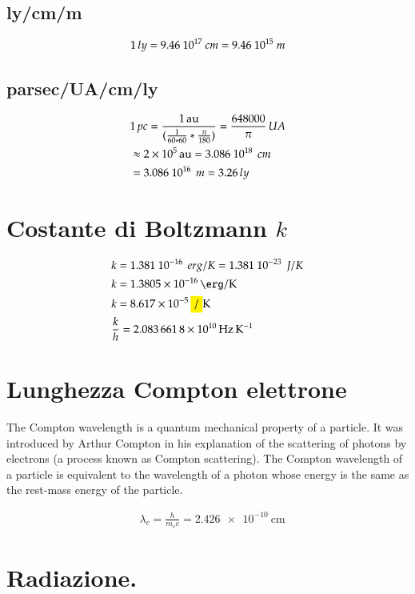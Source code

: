 \documentclass[main.tex]{subfiles}
\begin{document}
\subsection{ly/cm/m}

\begin{equation*}
1\,ly=9.46\ 10^{17}\ cm=9.46\ 10^{15}\ m
\end{equation*}

\subsection{parsec/UA/cm/ly}

\begin{align*}
&1\,pc=\frac{\SI{1}{\astronomicalunit}}{(\frac{1}{60*60}*\frac{\pi}{180})}=\frac{648000}{\pi}\,UA\\
&\approx\SI{2e5}{\astronomicalunit}=3.086\sci{18}\,cm\\
&=3.086\sci{16}\,m=3.26\,ly
\end{align*}

\section{Costante di Boltzmann $k$}


\begin{align*}
&k=1.381\sci{-16}\,erg/K=1.381\sci{-23}\,J/K\\
&k=\SI{1.3805e-16}{\erg\per\kelvin}\\
&k=\SI{8.617e-5}{\ev\per\kelvin}\\
&\frac{k}{h}=\SI{2,0836618e10}{\hertz\per\kelvin}
\end{align*}

\section{Lunghezza Compton elettrone}

The Compton wavelength is a quantum mechanical property of a particle. It was introduced by Arthur Compton in his explanation of the scattering of photons by electrons (a process known as Compton scattering). The Compton wavelength of a particle is equivalent to the wavelength of a photon whose energy is the same as the rest-mass energy of the particle.

\begin{align*}
&\lambda_c=\frac{h}{m_ec}=\SI{2.426e-10}{\cm}
\end{align*}


\section{Radiazione.}
\end{document}
